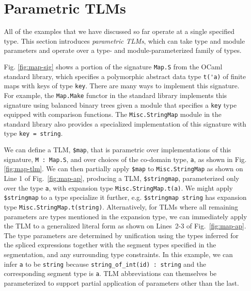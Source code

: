 \documentclass[acmsmall,screen]{acmart}
\newcommand{\li}[1]{\lstinline[basicstyle=\ttfamily\fontsize{9pt}{1em}\selectfont]{#1}}
\begin{document}
\section{Parametric TLMs}
\label{sec:ptsms}

All of the examples that we have discussed so far operate at a single specified type. This section introduces \emph{parametric TLMs}, which can take type and module parameters and operate over a type- and module-parameterized family of types. %


Fig. \ref{fig:map-sig} shows a portion of the signature \li{Map.S} from the OCaml standard library, which specifies a polymorphic abstract data type \li{t('a)} of finite maps with keys of type \li{key}. There are many ways to implement this signature. For example, the \li{Map.Make} functor in the standard library implements this signature using balanced binary trees given a module that specifies a \li{key} type equipped with comparison functions. The \li{Misc.StringMap} module in the standard library also provides a specialized implementation of this signature with type \li{key = string}.

We can define a TLM, \li{$map}, that is parametric over implementations of this signature, \li{M : Map.S}, and over choices of the co-domain type, \li{a}, as shown in Fig. \ref{fig:map-tlm}. We can then partially apply \li{$map} to \li{Misc.StringMap} as shown on Line 1 of Fig.~\ref{fig:map-ap}, producing a TLM, \li{$stringmap},  parameterized only over the type \li{a}, with expansion type \li{Misc.StringMap.t(a)}. We might apply \li{$stringmap} to a type specialize it further, e.g. \li{$stringmap string} has expansion type \li{Misc.StringMap.t(string)}. Alternatively, for TLMs where all remaining parameters are types mentioned in the expansion type, we can immediately apply the TLM to a generalized literal form as shown on Lines~2-3 of Fig.~\ref{fig:map-ap}. The type parameters are determined by unification using the types inferred for the spliced expressions together with the segment types specified in the segmentation, and any surrounding type constraints. In this example, we can infer \li{a} to be \li{string} because \li{string_of_int(id) : string} and the corresponding segment type is \li{a}. TLM abbreviations can themselves be parameterized to support partial application of parameters other than the last.
\end{document}

